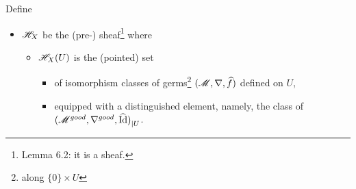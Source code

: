 \begin{defn}
\begin{itemize}
  \end{itemize}
  Define
  \begin{itemize}
    \item $\mathscr{H}_X$ be the (pre-) sheaf\footnote{Lemma 6.2: it is a sheaf.} where
      \begin{itemize}
        \item $\mathscr{H}_X(U)$ is the (pointed) set
          \begin{itemize}
            \item of isomorphism classes of
              germs\footnote{along $\{0\}\times U$}
              $(\mathscr{M},\nabla,\widehat f)$ defined on $U$,
              \begin{comment}
                \begin{itemize}
                  \item Why germs??
                  \item along $\{0\}\times U$??
                \end{itemize}
              \end{comment}
            \item equipped with a distinguished element, namely, the class of
              ${(\mathscr{M}^{good},\nabla^{good},\widehat{\operatorname{Id}})}_{|U}$.
          \end{itemize}
      \end{itemize}
  \end{itemize}
\end{defn}


